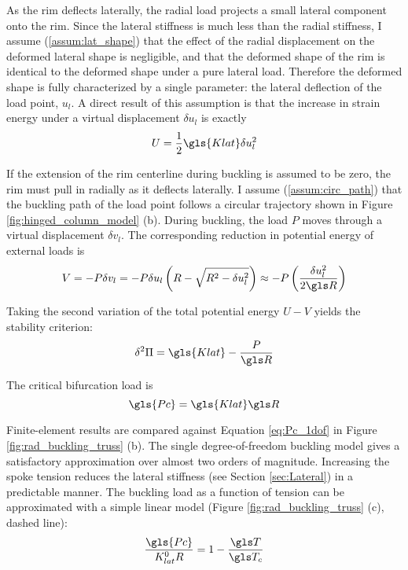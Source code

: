 \documentclass[\rootdir/thesis.tex]{subfiles}
\begin{document}
As the rim deflects laterally, the radial load projects a small lateral component onto the rim. Since the lateral stiffness is much less than the radial stiffness, I assume (\ref{assum:lat_shape}) that the effect of the radial displacement on the deformed lateral shape is negligible, and that the deformed shape of the rim is identical to the deformed shape under a pure lateral load. Therefore the deformed shape is fully characterized by a single parameter: the lateral deflection of the load point, $u_l$. A direct result of this assumption is that the increase in strain energy under a virtual displacement $\delta u_l$ is exactly
\begin{equation}
\label{eq:U_rim_1dof}
U = \frac{1}{2} \gls{Klat} \delta u_l^2
\end{equation}

If the extension of the rim centerline during buckling is assumed to be zero, the rim must pull in radially as it deflects laterally. I assume (\ref{assum:circ_path}) that the buckling path of the load point follows a circular trajectory shown in Figure \ref{fig:hinged_column_model} (b). During buckling, the load $P$ moves through a virtual displacement $\delta v_l$. The corresponding reduction in potential energy of external loads is
\begin{equation}
\label{eq:V_rim_1dof}
V = -P\delta v_l = -P \delta u_l \left(\\R - \sqrt{R^2 - \delta u_l^2}\right)
\approx -P \left(\frac{\delta u_l^2}{2\R}\right)
\end{equation}

Taking the second variation of the total potential energy $U-V$ yields the stability criterion:
\begin{equation}
\label{eq:ddPi_1dof}
\delta^2 \Pi = \gls{Klat} - \frac{P}{\R}
\end{equation}

The critical bifurcation load is
\begin{equation}
\label{eq:Pc_1dof}
\gls{Pc} = \gls{Klat}\R
\end{equation}

Finite-element results are compared against Equation \eqref{eq:Pc_1dof} in Figure \ref{fig:rad_buckling_truss} (b). The single degree-of-freedom buckling model gives a satisfactory approximation over almost two orders of magnitude. Increasing the spoke tension reduces the lateral stiffness (see Section \ref{sec:Lateral}) in a predictable manner. The buckling load as a function of tension can be approximated with a simple linear model (Figure \ref{fig:rad_buckling_truss} (c), dashed line):
\begin{equation}
\label{eq:P_c_T}
\frac{\gls{Pc}}{K_{lat}^0 R} = 1 - \frac{\T}{\T_c}
\end{equation}
\end{document}
